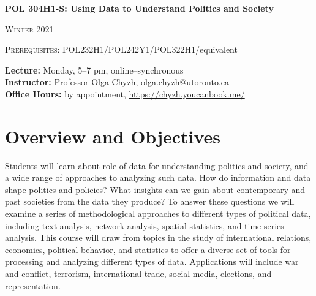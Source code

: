 \documentclass[12pt]{article}
\begin{document}
\thispagestyle{plain} %






\begin{center}
\bigskip
\large{\bf{POL 304H1-S: Using Data to Understand Politics and Society}}

\textsc{Winter 2021} \\
\end{center}
\textsc{Prerequisites:} POL232H1/POL242Y1/POL322H1/equivalent

\bigskip
\noindent \textbf{Lecture:} Monday, 5--7 pm, online--synchronous \\
\noindent\textbf{Instructor: } Professor Olga Chyzh, olga.chyzh@utoronto.ca\\ 
\noindent\textbf{Office Hours:}  by appointment, \url{https://chyzh.youcanbook.me/} \\


\section*{Overview and Objectives}
Students will learn about role of data for understanding politics and society, and a wide range of approaches to analyzing such data. How do information and data shape politics and policies? What insights can we gain about contemporary and past societies from the data they produce? To answer these questions we will examine a series of methodological approaches to different types of political data, including text analysis, network analysis, spatial statistics, and time-series analysis. This course will draw from topics in the study of international relations, economics, political behavior, and statistics to offer a diverse set of tools for processing and analyzing different types of data. Applications will include war and conflict, terrorism, international trade, social media, elections, and representation.
\end{document}
